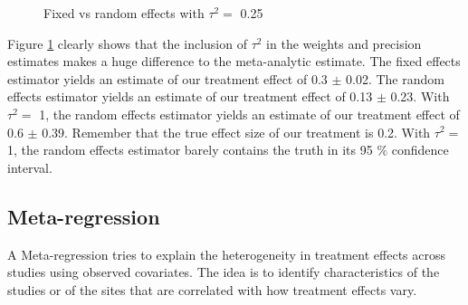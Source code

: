 \documentclass[]{book}
\newenvironment{Shaded}{\begin{snugshade}}{\end{snugshade}}
\newcommand{\KeywordTok}[1]{\textcolor[rgb]{0.13,0.29,0.53}{\textbf{#1}}}
\newcommand{\DataTypeTok}[1]{\textcolor[rgb]{0.13,0.29,0.53}{#1}}
\newcommand{\DecValTok}[1]{\textcolor[rgb]{0.00,0.00,0.81}{#1}}
\newcommand{\StringTok}[1]{\textcolor[rgb]{0.31,0.60,0.02}{#1}}
\newcommand{\OperatorTok}[1]{\textcolor[rgb]{0.81,0.36,0.00}{\textbf{#1}}}
\newcommand{\NormalTok}[1]{#1}
\theoremstyle{definition}
\theoremstyle{definition}
\theoremstyle{definition}
\theoremstyle{remark}
\begin{document}
\begin{Shaded}
\end{Shaded}

\begin{figure}[htbp]

{\centering {}

}

\caption{Fixed vs random effects with $\tau^2=$ 0.25}\label{fig:FEvsRE}
\end{figure}

Figure \ref{fig:FEvsRE} clearly shows that the inclusion of \(\tau^2\)
in the weights and precision estimates makes a huge difference to the
meta-analytic estimate. The fixed effects estimator yields an estimate
of our treatment effect of 0.3 \(\pm\) 0.02. The random effects
estimator yields an estimate of our treatment effect of 0.13 \(\pm\)
0.23. With \(\tau^2=\) 1, the random effects estimator yields an
estimate of our treatment effect of 0.6 \(\pm\) 0.39. Remember that the
true effect size of our treatment is 0.2. With \(\tau^2=\) 1, the random
effects estimator barely contains the truth in its 95 \(\%\) confidence
interval.

\subsection{Meta-regression}\label{meta-regression}

A Meta-regression tries to explain the heterogeneity in treatment
effects across studies using observed covariates. The idea is to
identify characteristics of the studies or of the sites that are
correlated with how treatment effects vary.
\end{document}
